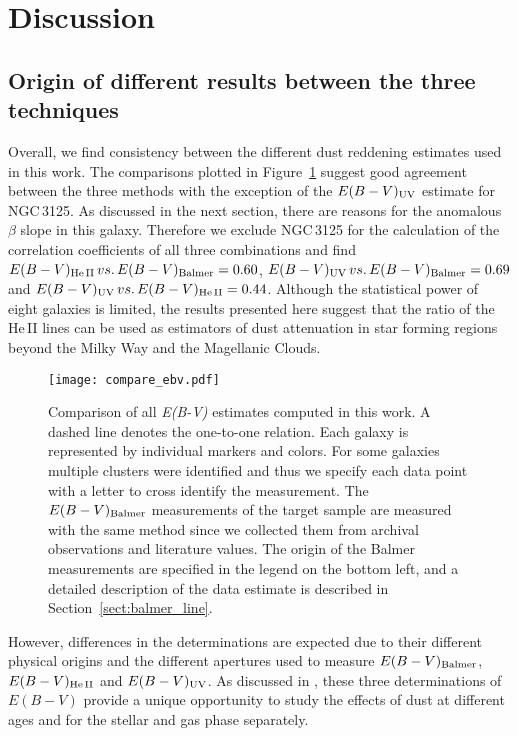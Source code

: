\documentclass[linenumbers]{aastex63}
\begin{document}
\section{Discussion}\label{sect:discussion}

\subsection{Origin of different results between the three techniques}
Overall, we find consistency between the different dust reddening estimates used in this work. The comparisons plotted in Figure~\ref{fig:compare_ebv} suggest good agreement between the three methods with the exception of the $E(B-V)_{\rm UV}$ estimate for NGC\,3125. As discussed in the next section, there are reasons for the anomalous $\beta$ slope in this galaxy. Therefore we exclude NGC\,3125 for the calculation of the correlation coefficients of all three combinations and find $E(B-V)_{\rm He\,II} \,vs.\, E(B-V)_{\rm Balmer} = 0.60$, $E(B-V)_{\rm UV} \,vs.\, E(B-V)_{\rm Balmer} = 0.69$ and $E(B-V)_{\rm UV} \,vs.\, E(B-V)_{\rm He\,II} = 0.44$.  Although the statistical power of eight galaxies is limited, the results presented here suggest that the ratio of the He\,II lines can be used as estimators of dust attenuation in star forming regions beyond the Milky Way and the Magellanic Clouds.


%
\begin{figure*}[h!]
    \centering
    \texttt{[image: compare\_ebv.pdf]}
    \caption{Comparison of all {\it E(B-V)} estimates computed in this work. A dashed line denotes the one-to-one relation. Each galaxy is represented by individual markers and colors. For some galaxies multiple clusters were identified and thus we specify each data point with a letter to cross identify the measurement. The ${E(B-V)_{\rm Balmer}}$ measurements of the target sample are measured with the same method since we collected them from archival observations and literature values. The origin of the Balmer measurements are specified in the legend on the bottom left, and a detailed description of the data estimate is described in Section~\ref{sect:balmer_line}. } 
    \label{fig:compare_ebv}
\end{figure*}

However, differences in the determinations are expected due to their different physical origins and the different apertures used to measure ${E(B-V)_{\rm Balmer}}$, ${E(B-V)_{\rm He\,II}}$ and ${E(B-V)_{\rm UV}}$. As discussed in \citet{leitherer_he_2019}, these three determinations of $E(B-V)$ provide a unique opportunity to study the effects of dust at different ages and for the stellar and gas phase separately.  
\end{document}
